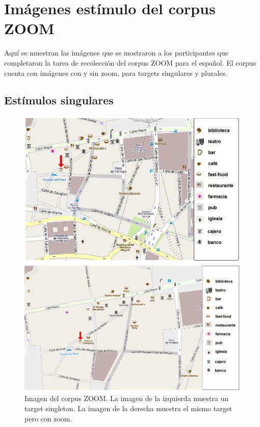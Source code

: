 \section{Im\'agenes est\'imulo del corpus ZOOM}
\label{imagenes-zoom}
Aqu\'i se muestran las im\'agenes que se mostraron a los participantes que completaron la tarea de recolecci\'on del corpus ZOOM para el espa\~nol. El corpus cuenta con im\'agenes con y sin zoom, para targets singulares y plurales. 

\subsection{Est\'imulos singulares}

\begin{figure}
\begin{minipage}[ht]{0.48\linewidth}
\centering
\includegraphics[width=\textwidth]{images/corpus/mapa3.png}
\caption{}
\label{mapa1}
\end{minipage}
\hspace*{0cm}
\begin{minipage}[ht]{0.55\linewidth}
\centering
\includegraphics[width=\textwidth]{images/corpus/mapa13.png}
\caption{}
\label{mapa2}
\end{minipage}
\caption{Imagen del corpus ZOOM. La imagen de la izquierda muestra un target singleton. La imagen de la derecha muestra el mismo target pero con zoom.}
\end{figure}

